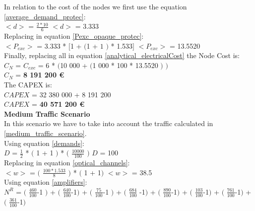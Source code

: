 In relation to the cost of the nodes we first use the equation \ref{average_demand_protec}:\\

$<d>$ = $\frac{2 * 10}{6}$ \qquad \qquad $<d>$ = 3.333\\

Replacing in equation \ref{Pexc_opaque_protec}:\\

$<P_{exc}>$ = 3.333 * $[$1 + $($1 + $1$ $)$ * 1.533$]$ \qquad \quad $<P_{exc}>$ = 13.5520 \\

Finally, replacing all in equation \ref{analytical_electricalCost} the Node Cost is:\\

$C_N$ = $C_{exc}$ = 6 * $($10 000 + $($1 000 * 100 * 13.5520 $)$ $)$\\

$C_N$ = \textbf{8 191 200 \euro}\\

The CAPEX is:\\
$CAPEX$ = 32 380 000 + 8 191 200\\

$CAPEX$ = \textbf{40 571 200 \euro}\\

\textbf{Medium Traffic Scenario}\\
In this scenario we have to take into account the traffic calculated in \ref{medium_traffic_scenario}.\\

Using equation \ref{demands}:\\

$D$ = $\frac{1}{2}$ * $($ 1 + 1 $)$ * $($ $\frac{10000}{100}$ $)$ \qquad \qquad $D$ = 100\\

Replacing in equation \ref{optical_channels}:\\

$<w>$ = $($ $\frac{100 * 1.533}{8}$ $)$ * $($ 1 + 1$)$ \qquad \qquad $<w>$ = 38.5\\

Using equation \ref{amplifiers}:\\

$N^R$ = $($ $\frac{460}{100}$-1 $)$ + $($ $\frac{640}{100}$-1$)$ + $($ $\frac{75}{100}$-1 $)$ + $($ $\frac{684}{100}$ -1$)$ + $($ $\frac{890}{100}$-1$)$ + $($ $\frac{103}{100}$-1$)$ + $($ $\frac{761}{100}$-1$)$ + $($ $\frac{361}{100}$-1$)$\\


